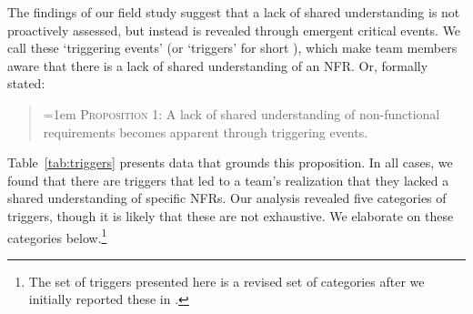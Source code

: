 \documentclass[smallextended]{svjour3}       %
\newcommand\cwproposition[2]{
\begin{quote}
\normalsize 
\vspace{0.5em}\hangindent=1em \textmd{\textsc{Proposition #1}: #2}\vspace{0.5em}
\end{quote}
}
\begin{document}
The findings of our field study suggest that a lack of shared understanding is not proactively assessed, but instead is revealed through emergent critical events. 
We call these `triggering events' (or `triggers' for short \citep{werner2020re}), which make team members aware that there is a lack of shared understanding of an NFR. Or, formally stated:

\cwproposition{1}{A lack of shared understanding of non-functional requirements becomes apparent through triggering events.}

Table~\ref{tab:triggers} presents data that grounds this proposition. In all cases, we found that there are triggers that led to a team's realization that they lacked a shared understanding of specific NFRs. 
Our analysis revealed five categories of triggers, though it is likely that these are not exhaustive. We elaborate on these categories below.\footnote{The set of triggers presented here is a revised set of categories after we initially reported these in \cite{werner2020re}.}
\end{document}
